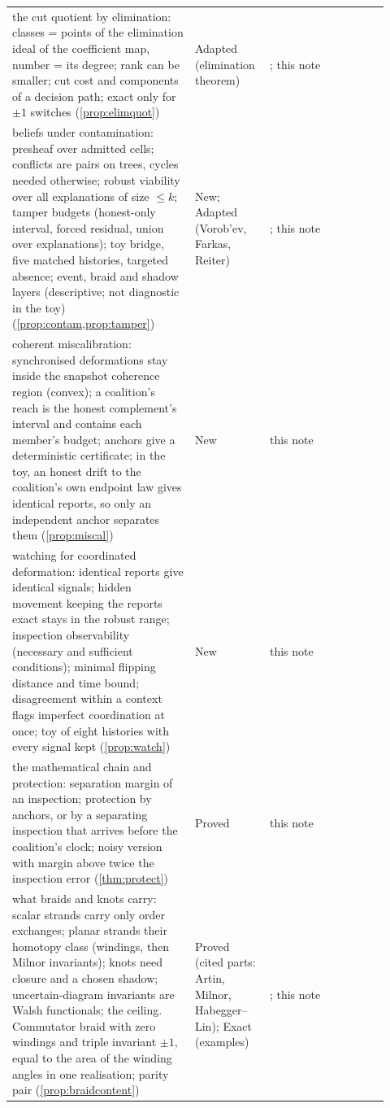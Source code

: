 \documentclass[11pt]{article}
\theoremstyle{definition}\newtheorem{definition}[theorem]{Definition}\newtheorem{remark}[theorem]{Remark}\newtheorem{example}[theorem]{Example}\newtheorem{problem}[theorem]{Open problem}\crefname{problem}{Problem}{Problems}
\begin{document}
{\begin{longtable}{p{0.46\linewidth}p{0.16\linewidth}p{0.3\linewidth}}
\rowcolor{stAdapted} the cut quotient by elimination: classes = points of the elimination ideal of the coefficient map, number = its degree; rank can be smaller; cut cost and components of a decision path; exact only for $\pm1$ switches (\cref{prop:elimquot}) & Adapted (elimination theorem) & \cite{CoxLittleOShea2015}; this note\\
\rowcolor{stNew} beliefs under contamination: presheaf over admitted cells; conflicts are pairs on trees, cycles needed otherwise; robust viability over all explanations of size $\le k$; tamper budgets (honest-only interval, forced residual, union over explanations); toy bridge, five matched histories, targeted absence; event, braid and shadow layers (descriptive; not diagnostic in the toy) (\cref{prop:contam,prop:tamper}) & New; Adapted (Vorob'ev, Farkas, Reiter) & \cite{Vorobev1962,Reiter1987,Schrijver1986}; this note\\
\rowcolor{stNew} coherent miscalibration: synchronised deformations stay inside the snapshot coherence region (convex); a coalition's reach is the honest complement's interval and contains each member's budget; anchors give a deterministic certificate; in the toy, an honest drift to the coalition's own endpoint law gives identical reports, so only an independent anchor separates them (\cref{prop:miscal}) & New & this note\\
\rowcolor{stNew} watching for coordinated deformation: identical reports give identical signals; hidden movement keeping the reports exact stays in the robust range; inspection observability (necessary and sufficient conditions); minimal flipping distance and time bound; disagreement within a context flags imperfect coordination at once; toy of eight histories with every signal kept (\cref{prop:watch}) & New & this note\\
\rowcolor{stNew} the mathematical chain and protection: separation margin of an inspection; protection by anchors, or by a separating inspection that arrives before the coalition's clock; noisy version with margin above twice the inspection error (\cref{thm:protect}) & Proved & this note\\
\rowcolor{stNew} what braids and knots carry: scalar strands carry only order exchanges; planar strands their homotopy class (windings, then Milnor invariants); knots need closure and a chosen shadow; uncertain-diagram invariants are Walsh functionals; the ceiling. Commutator braid with zero windings and triple invariant $\pm1$, equal to the area of the winding angles in one realisation; parity pair (\cref{prop:braidcontent}) & Proved (cited parts: Artin, Milnor, Habegger--Lin); Exact (examples) & \cite{Artin1947,Birman1974,Milnor1954,HabeggerLin1990,Chen1977,Kohno1985}; this note\\

\end{longtable}}
\end{document}
